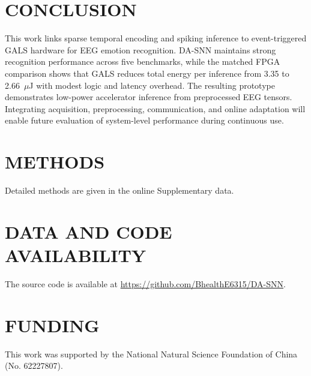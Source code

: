 \documentclass{nsr}
\begin{document}
\section{CONCLUSION}
This work links sparse temporal encoding and spiking inference to event-triggered GALS hardware for EEG emotion recognition. DA-SNN maintains strong recognition performance across five benchmarks, while the matched FPGA comparison shows that GALS reduces total energy per inference from 3.35 to 2.66~$\mu$J with modest logic and latency overhead. The resulting prototype demonstrates low-power accelerator inference from preprocessed EEG tensors. Integrating acquisition, preprocessing, communication, and online adaptation will enable future evaluation of system-level performance during continuous use.

\section{METHODS}
Detailed methods are given in the online Supplementary data.

\section{DATA AND CODE AVAILABILITY}
The source code is available at \url{https://github.com/BhealthE6315/DA-SNN}.

\section{FUNDING}
This work was supported by the National Natural Science Foundation of China (No. 62227807).



\end{document}
